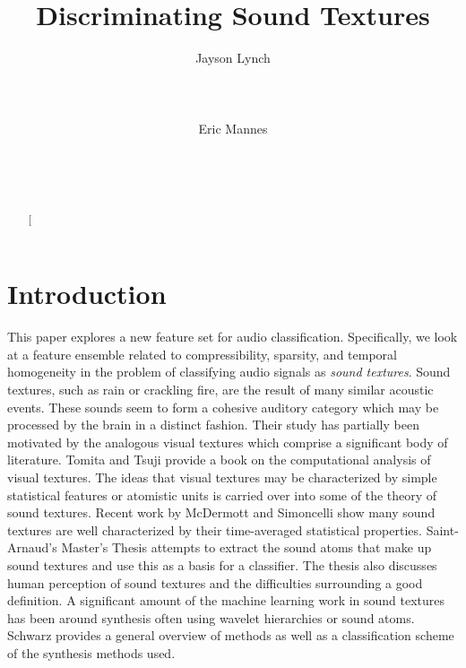 \documentclass{sig-alternate-05-2015}
\makeatletter
\gdef\xxx{\@ifnextchar[\xxx@lab\xxx@nolab}
\makeatother
\begin{document}
\title{Discriminating Sound Textures}



\auskip

\author{
\alignauthor
  Jayson Lynch \\
  \\
       \\
       \\
\alignauthor Eric Mannes\\
\\
       \\
       \\
       }

\maketitle
\begin{abstract}
\xxx{write abstract}
\end{abstract}


\section{Introduction} 
This paper explores a new feature set for audio classification. Specifically, we look at a feature ensemble related to compressibility, sparsity, and temporal homogeneity in the problem of classifying audio signals as \emph{sound textures}. Sound textures, such as rain or crackling fire, are the result of many similar acoustic events. These sounds seem to form a cohesive auditory category which may be processed by the brain in a distinct fashion\cite{McDermott2011926, mcdermott2013summary}. Their study has partially been motivated by the analogous visual textures which comprise a significant body of literature. Tomita and Tsuji provide a book on the computational analysis of visual textures\cite{tomita2013computer}. The ideas that visual textures may be characterized by simple statistical features\cite{julesz1962visual} or atomistic units\cite{julesz1981textons} is carried over into some of the theory of sound textures. Recent work by McDermott and Simoncelli show many sound textures are well characterized by their time-averaged statistical properties\cite{McDermott2011926, mcdermott2013summary}. Saint-Arnaud's Master's Thesis attempts to extract the sound atoms that make up sound textures and use this as a basis for a classifier\cite{saint1995classification}. The thesis also discusses human perception of sound textures and the difficulties surrounding a good definition. A significant amount of the machine learning work in sound textures has been around synthesis often using wavelet hierarchies\cite{kersten2010sound} or sound atoms\cite{saint1995analysis}. Schwarz provides a general overview of methods as well as a classification scheme of the synthesis methods used\cite{schwarz2011state}.
\end{document}
